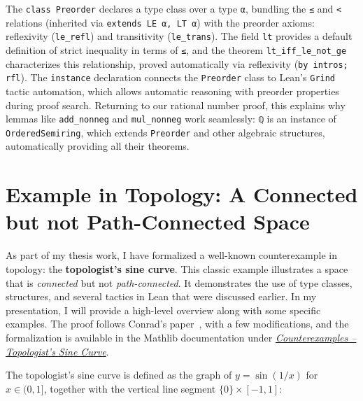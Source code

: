 The \lstinline[language=lean]|class Preorder| declares a type class over a type
\lstinline[language=lean]|α|, bundling the \lstinline[language=lean]|≤|
and \lstinline[language=lean]|<| relations
(inherited via \lstinline[language=lean]|extends LE α, LT α|)
with the preorder axioms: reflexivity (\lstinline[language=lean]|le_refl|)
and transitivity (\lstinline[language=lean]|le_trans|).
The field \lstinline[language=lean]|lt| provides a default definition of strict
inequality in terms of \lstinline[language=lean]|≤|,
and the theorem \lstinline[language=lean]|lt_iff_le_not_ge| characterizes this relationship,
proved automatically via reflexivity (\lstinline[language=lean]|by intros; rfl|).
The \lstinline[language=lean]|instance| declaration connects the \lstinline[language=lean]|Preorder|
class to Lean's \lstinline[language=lean]|Grind| tactic automation, which allows automatic
reasoning with preorder properties during proof search.
Returning to our rational number proof, this explains why lemmas
like \lstinline[language=lean]|add_nonneg| and \lstinline[language=lean]|mul_nonneg|
work seamlessly: \lstinline[language=lean]|ℚ| is an instance of
\lstinline[language=lean]|OrderedSemiring|, which extends
\lstinline[language=lean]|Preorder| and other algebraic structures,
automatically providing all their theorems.

\section{Example in Topology: A Connected but not Path-Connected Space}

As part of my thesis work, I have formalized a well-known counterexample in topology: the \textbf{topologist’s sine curve}.
This classic example illustrates a space that is \emph{connected} but not \emph{path-connected}.
It demonstrates the use of type classes, structures, and several tactics in Lean that were discussed earlier.
In my presentation, I will provide a high-level overview along with some specific examples.
The proof follows Conrad’s paper~\cite{Conrad_connnotpathconn}, with a few modifications, and the formalization is available in the Mathlib documentation under \href{https://leanprover-community.github.io/mathlib4_docs/Counterexamples/TopologistsSineCurve.html}{\emph{Counterexamples – Topologist’s Sine Curve}}.

The topologist's sine curve is defined as the graph of $y = \sin(1/x)$ for $x \in (0, 1]$,
together with the vertical line segment $\{0\} \times [-1, 1]$:

